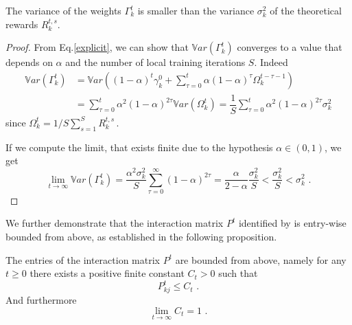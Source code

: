 \begin{proposition}\label{prop_var}
The variance of the weights $\Gamma_k^t$ is smaller than the variance $\sigma_k^2$ of the theoretical rewards $R_k^{t,s}$.
\end{proposition} 
\begin{proof}
From Eq.\ref{explicit}, we can show that $\mathbb{V}ar(\Gamma_k^t)$ converges to a value that depends on $\alpha$ and the number of local training iterations $S$. Indeed
\begin{equation}
\begin{split}
\mathbb{V}ar(\Gamma_k^t) &= \mathbb{V}ar\left( (1-\alpha)^{t} \gamma_k^0 + \sum_{\tau = 0}^t \alpha (1-\alpha)^\tau \Omega_k^{t-\tau-1}\right) \\
&= \sum_{\tau = 0}^t \alpha^2 (1-\alpha)^{2\tau} \mathbb{V}ar(\Omega_k^t) = \dfrac{1}{S}\sum_{\tau = 0}^t \alpha^2 (1-\alpha)^{2\tau}\sigma_k^2
\end{split}
\end{equation}
since $\Omega_k^t = 1/S \sum_{s = 1}^S R_k^{t,s}$\,.

If we compute the limit, that exists finite due to the hypothesis $\alpha \in (0,1)$, we get
\begin{equation}
\lim_{t \to \infty}\mathbb{V}ar(\Gamma_k^t) = \dfrac{\alpha^2\sigma_k^2}{S}\sum_{\tau = 0}^\infty (1-\alpha)^{2\tau} = \dfrac{\alpha}{2-\alpha} \dfrac{\sigma_k^2}{S} <\dfrac{\sigma_k^2}{S}<\sigma_k^2\,\,.
\end{equation}
\end{proof}
We further demonstrate that the interaction matrix $P^t$ identified by \shortname is entry-wise bounded from above, as established in the following proposition.
\begin{proposition}\label{prop:bounded_matrix}
The entries of the interaction matrix $P^t$ are bounded from above, namely for any $t \geq 0$ there exists a positive finite constant $C_t > 0$ such that
\begin{equation}
    P_{kj}^t \leq C_t\,\,.
\end{equation}
And furthermore
\begin{equation}
    \lim_{t \to \infty} C_t = 1\,\,.
\end{equation}
\end{proposition}
